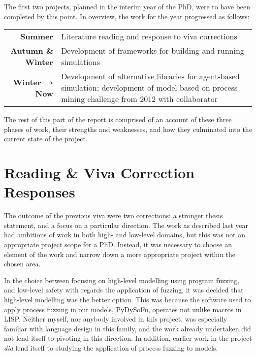 \documentclass[11pt]{article}
\newcommand{\ampersand}{\&}
\begin{document}
The first two projects, planned in the interim year of the PhD, were to have
been completed by this point. In overview, the work for the year progressed as
follows: \par

\begin{center}
\begin{tabular}{r p{9cm}}
\bf{Summer} & Literature reading and response to viva corrections \\
\bf{Autumn \& Winter} & Development of frameworks for building and running simulations \\
\bf{Winter → Now} & Development of alternative libraries for agent-based simulation;
development of model based on process mining challenge from 2012 with collaborator \\
\end{tabular}
\end{center}

The rest of this part of the report is comprised of an account of these three
phases of work, their strengths and weaknesses, and how they culminated into the
current state of the project.

\section{Reading \ampersand{} Viva Correction Responses}
\label{sec:orgf31641c}

The outcome of the previous viva were two corrections: a stronger thesis
statement, and a focus on a particular direction. The work as described last
year had ambitions of work in both high- and low-level domains, but this was not
an appropriate project scope for a PhD. Instead, it was necessary to choose an
element of the work and narrow down a more appropriate project within the chosen
area.


In the choice between focusing on high-level modelling using program fuzzing,
and low-level safety with regards the application of fuzzing, it was decided
that high-level modelling was the better option. This was because the software
used to apply process fuzzing in our models, PyDySoFu\cite{pydysofu_repo},
operates not unlike macros in LISP. Neither myself, nor anybody involved in this
project, was especially familiar with language design in this family, and the
work already undertaken did not lend itself to pivoting in this direction. In
addition, earlier work in the project \emph{did} lend itself to studying the
application of process fuzzing to models.
\end{document}
